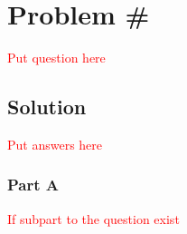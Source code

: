 
\newpage
\section{Problem #}

\textcolor{red}{Put question here}

\subsection{Solution}

\textcolor{red}{Put answers here}
	
\subsubsection{Part A}

\textcolor{red}{If subpart to the question exist}


